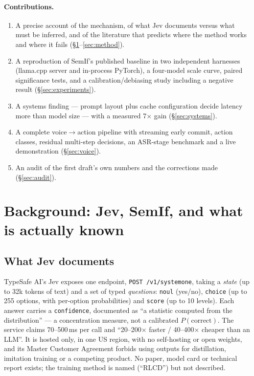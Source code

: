 \documentclass[11pt,a4paper]{article}
\newcommand{\code}[1]{\texttt{#1}}
\begin{document}
\paragraph{Contributions.}
\begin{enumerate}[label=(\arabic*)]
\item A precise account of the mechanism, of what Jev documents versus what must be inferred, and of the literature that predicts where the method works and where it fails (\S\ref{sec:background}--\ref{sec:method}).
\item A reproduction of SemIf's published baseline in two independent harnesses (llama.cpp server and in-process PyTorch), a four-model scale curve, paired significance tests, and a calibration/debiasing study including a negative result (\S\ref{sec:experiments}).
\item A systems finding --- prompt layout plus cache configuration decide latency more than model size --- with a measured 7$\times$ gain (\S\ref{sec:systems}).
\item A complete voice$\to$action pipeline with streaming early commit, action classes, residual multi-step decisions, an ASR-stage benchmark and a live demonstration (\S\ref{sec:voice}).
\item An audit of the first draft's own numbers and the corrections made (\S\ref{sec:audit}).
\end{enumerate}

\section{Background: Jev, SemIf, and what is actually known}
\label{sec:background}

\subsection{What Jev documents}
TypeSafe AI's Jev exposes one endpoint, \code{POST /v1/systemone}, taking a \emph{state} (up to 32k tokens of text) and a set of typed \emph{questions}: \code{noul} (yes/no), \code{choice} (up to 255 options, with per-option probabilities) and \code{score} (up to 10 levels). Each answer carries a \code{confidence}, documented as ``a statistic computed from the distribution'' --- a concentration measure, not a calibrated $P(\text{correct})$. The service claims 70--500\,ms per call and ``20--200$\times$ faster / 40--400$\times$ cheaper than an LLM''. It is hosted only, in one US region, with no self-hosting or open weights, and its Master Customer Agreement forbids using outputs for distillation, imitation training or a competing product. No paper, model card or technical report exists; the training method is named (``RLCD'') but not described.
\end{document}
